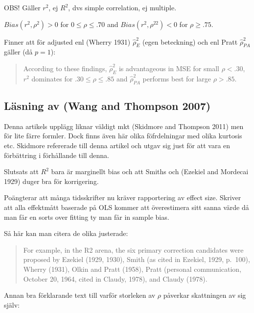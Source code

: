 \documentclass[]{article}
\begin{document}
OBS! Gäller \(r^2\), ej \(R^2\), dvs simple correlation, ej multiple.

\(Bias(r^2, \rho^2) > 0\) for \(0 \leq \rho \leq .70\) and
\(Bias(r^2, \rho^22) < 0\) for \(\rho \geq .75\).

Finner att för adjusted enl (Wherry 1931) \(\hat{\rho}_E^2\) (egen
beteckning) och enl Pratt \(\hat{\rho}^2_{PA}\) gäller (då \(p = 1\)):

\begin{quote}
According to these findings, \(\hat{\rho}_E^2\) is advantageous in MSE
for small \(\rho <.30\), \(r^2\) dominates for \(.30\leq \rho \leq .85\)
and \(\hat{\rho}^2_{PA}\) performs best for large \(\rho > .85\).
\end{quote}

\subsection{Läsning av (Wang and Thompson
2007)}\label{lasning-av-wang2007}

Denna artikels upplägg liknar väldigt mkt (Skidmore and Thompson 2011)
men för lite färre formler. Dock finns även här olika föfrdelningar med
olika kurtosis etc. Skidmore refererade till denna artikel och utgav sig
just för att vara en förbättring i förhållande till denna.

Slutsats att \(R^2\) bara är marginellt bias och att Smiths och (Ezekiel
and Mordecai 1929) duger bra för korrigering.

Poängterar att många tidsskrifter nu kräver rapportering av effect size.
Skriver att alla effektmått baserade på OLS kommer att överestimera sitt
sanna värde då man får en sorts over fitting ty man får in sample bias.

Så här kan man citera de olika justerade:

\begin{quote}
For example, in the R2 arena, the six primary correction candidates were
proposed by Ezekiel (1929, 1930), Smith (as cited in Ezekiel, 1929,
p.~100), Wherry (1931), Olkin and Pratt (1958), Pratt (personal
communication, October 20, 1964, cited in Claudy, 1978), and Claudy
(1978).
\end{quote}

Annan bra förklarande text till varför storleken av \(\rho\) påverkar
skattningen av sig själv:
\end{document}
